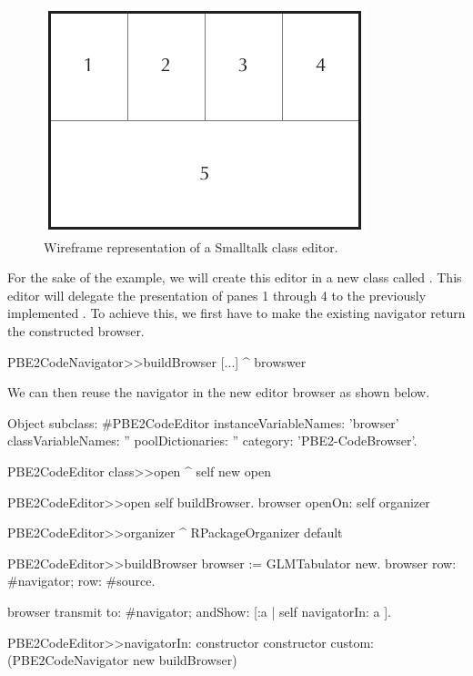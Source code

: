 \documentclass[a4paper,10pt,twoside]{book}
\begin{document}
\begin{figure}[htbp]
\centerline{\includegraphics[width=\linewidth]{classbrowser_wireframe.pdf}}
\caption{Wireframe representation of a Smalltalk class editor.}
\label{fig:classbrowser_wireframe}
\end{figure}

For the sake of the example, we will create this editor in a new class
called . This editor will delegate the presentation
of panes 1 through 4 to the previously implemented
. To achieve this, we first have to make the
existing navigator return the constructed browser.

\begin{code}{}
PBE2CodeNavigator>>buildBrowser
  [...]
  ^ browswer
\end{code}

We can then reuse the navigator in the new editor browser as shown
below.

\begin{code}{}
Object subclass: #PBE2CodeEditor
	instanceVariableNames: 'browser'
	classVariableNames: ''
	poolDictionaries: ''
	category: 'PBE2-CodeBrowser'.

PBE2CodeEditor class>>open
  ^ self new open

PBE2CodeEditor>>open
  self buildBrowser.
  browser openOn:  self  organizer

PBE2CodeEditor>>organizer 
  ^ RPackageOrganizer default

PBE2CodeEditor>>buildBrowser 
  browser := GLMTabulator new.
  browser 
    row: #navigator;
    row: #source.
    
  browser transmit to: #navigator; andShow:  [:a | self navigatorIn: a ]. 

PBE2CodeEditor>>navigatorIn:  constructor
  constructor  custom:  (PBE2CodeNavigator new buildBrowser)
\end{code}
\end{document}
